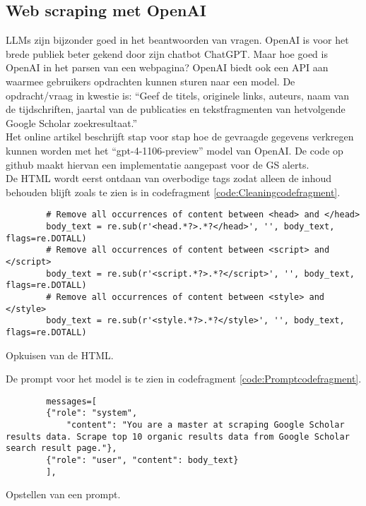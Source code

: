 \subsection{Web scraping met OpenAI}
LLMs zijn bijzonder goed in het beantwoorden van vragen. OpenAI is voor het brede publiek beter gekend door zijn chatbot ChatGPT. Maar hoe goed is OpenAI in het parsen van een webpagina? OpenAI biedt ook een API \autocite{Openaideveloperplatform2025} aan waarmee gebruikers opdrachten kunnen sturen naar een model. De opdracht/vraag in kwestie is: ``Geef de titels, originele links, auteurs, naam van de tijdschriften, jaartal van de publicaties en tekstfragmenten van hetvolgende Google Scholar zoekresultaat.''\\
Het online artikel \textcite{Serpapiai2025} beschrijft stap voor stap hoe de gevraagde gegevens verkregen kunnen worden met het ``gpt-4-1106-preview'' model van OpenAI.
De code op github \textcite{Depaepeopenai2025} maakt hiervan een implementatie aangepast voor de GS alerts.\\
De HTML wordt eerst ontdaan van overbodige tags zodat alleen de inhoud behouden blijft zoals te zien is in codefragment \ref{code:Cleaningcodefragment}.
\begin{listing}[h!]
    \begin{verbatim}
        # Remove all occurrences of content between <head> and </head>
        body_text = re.sub(r'<head.*?>.*?</head>', '', body_text, flags=re.DOTALL)
        # Remove all occurrences of content between <script> and </script>
        body_text = re.sub(r'<script.*?>.*?</script>', '', body_text, flags=re.DOTALL)
        # Remove all occurrences of content between <style> and </style>
        body_text = re.sub(r'<style.*?>.*?</style>', '', body_text, flags=re.DOTALL)
    \end{verbatim}
    \caption[HTML cleaning]{Opkuisen van de HTML.}
    \label{code:Cleaningcodefragment}
\end{listing}
De prompt voor het model is te zien in codefragment \ref{code:Promptcodefragment}.
\begin{listing}[h!]
    \begin{verbatim}
        messages=[
        {"role": "system",
            "content": "You are a master at scraping Google Scholar results data. Scrape top 10 organic results data from Google Scholar search result page."},
        {"role": "user", "content": body_text}
        ],
    \end{verbatim}
    \caption[OpenAI prompt]{Opstellen van een prompt.}
    \label{code:Promptcodefragment}
\end{listing}
